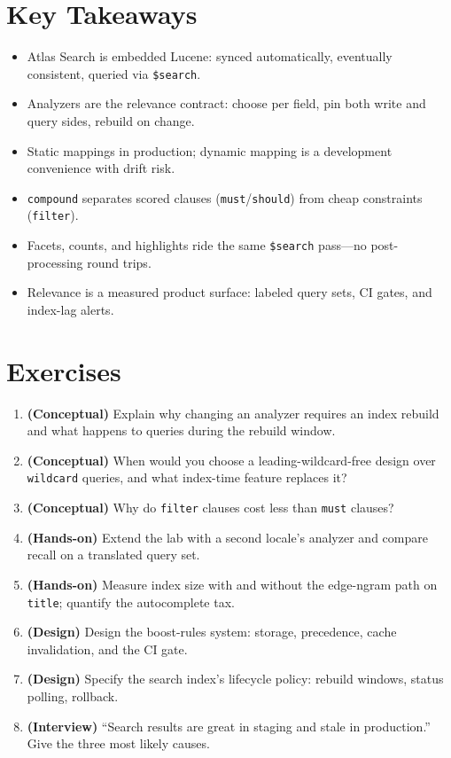 \section*{Key Takeaways}
\begin{itemize}
    \item Atlas Search is embedded Lucene: synced automatically, eventually consistent, queried via \texttt{\$search}.
    \item Analyzers are the relevance contract: choose per field, pin both write and query sides, rebuild on change.
    \item Static mappings in production; dynamic mapping is a development convenience with drift risk.
    \item \texttt{compound} separates scored clauses (\texttt{must}/\texttt{should}) from cheap constraints (\texttt{filter}).
    \item Facets, counts, and highlights ride the same \texttt{\$search} pass---no post-processing round trips.
    \item Relevance is a measured product surface: labeled query sets, CI gates, and index-lag alerts.
\end{itemize}

\section{Exercises}
\begin{enumerate}
    \item \textbf{(Conceptual)} Explain why changing an analyzer requires an index rebuild and what happens to queries during the rebuild window.
    \item \textbf{(Conceptual)} When would you choose a leading-wildcard-free design over \texttt{wildcard} queries, and what index-time feature replaces it?
    \item \textbf{(Conceptual)} Why do \texttt{filter} clauses cost less than \texttt{must} clauses?
    \item \textbf{(Hands-on)} Extend the lab with a second locale's analyzer and compare recall on a translated query set.
    \item \textbf{(Hands-on)} Measure index size with and without the edge-ngram path on \texttt{title}; quantify the autocomplete tax.
    \item \textbf{(Design)} Design the boost-rules system: storage, precedence, cache invalidation, and the CI gate.
    \item \textbf{(Design)} Specify the search index's lifecycle policy: rebuild windows, status polling, rollback.
    \item \textbf{(Interview)} ``Search results are great in staging and stale in production.'' Give the three most likely causes.
\end{enumerate}

